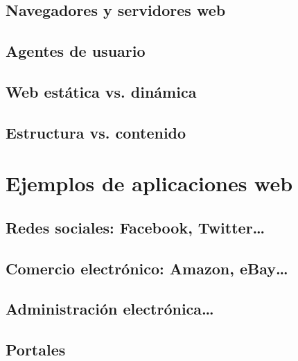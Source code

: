 \documentclass[a4paper,12pt,spanish]{sphinxmanual}
\begin{document}
\subsection{Navegadores y servidores web}
\label{\detokenize{introduccion:navegadores-y-servidores-web}}

\subsection{Agentes de usuario}
\label{\detokenize{introduccion:agentes-de-usuario}}

\subsection{Web estática vs. dinámica}
\label{\detokenize{introduccion:web-estatica-vs-dinamica}}

\subsection{Estructura vs. contenido}
\label{\detokenize{introduccion:estructura-vs-contenido}}

\section{Ejemplos de aplicaciones web}
\label{\detokenize{introduccion:ejemplos-de-aplicaciones-web}}

\subsection{Redes sociales: Facebook, Twitter…}
\label{\detokenize{introduccion:redes-sociales-facebook-twitter}}

\subsection{Comercio electrónico: Amazon, eBay…}
\label{\detokenize{introduccion:comercio-electronico-amazon-ebay}}

\subsection{Administración electrónica…}
\label{\detokenize{introduccion:administracion-electronica}}

\subsection{Portales}
\label{\detokenize{introduccion:portales}}
\end{document}
